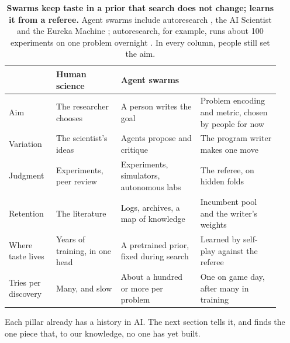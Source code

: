 \begin{table}[t]
  \caption{\textbf{Swarms keep taste in a prior that search does not change; \EZ{} learns it from a referee.} Agent swarms include autoresearch \citep{karpathy2026autoresearch}, the AI Scientist \citep{lu2024aiscientist} and the Eureka Machine \citep{socher2026eureka}; autoresearch, for example, runs about 100 experiments on one problem overnight \citep{karpathy2026autoresearch}. In every column, people still set the aim.}
  \label{tab:where}
  \centering
  \footnotesize
  \begin{tabular}{@{}>{\raggedright\arraybackslash}p{0.16\linewidth}>{\raggedright\arraybackslash}p{0.22\linewidth}>{\raggedright\arraybackslash}p{0.27\linewidth}>{\raggedright\arraybackslash}p{0.27\linewidth}@{}}
    \toprule
     & Human science & Agent swarms & \EZ{} \\
    \midrule
    Aim & The researcher chooses & A person writes the goal & Problem encoding and metric, chosen by people for now \\
    Variation & The scientist's ideas & Agents propose and critique & The program writer makes one move \\
    Judgment & Experiments, peer review & Experiments, simulators, autonomous labs & The referee, on hidden folds \\
    Retention & The literature & Logs, archives, a map of knowledge & Incumbent pool and the writer's weights \\
    \addlinespace
    Where taste lives & Years of training, in one head & A pretrained prior, fixed during search & Learned by self-play against the referee \\
    Tries per discovery & Many, and slow & About a hundred or more per problem & One on game day, after many in training \\
    \bottomrule
  \end{tabular}
\end{table}

Each pillar already has a history in AI. The next section tells it, and finds the one piece that, to our knowledge, no one has yet built.
